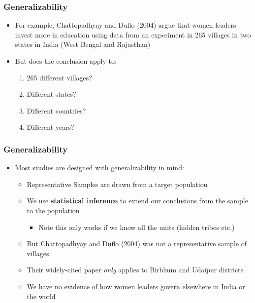 \documentclass[xcolor=x11names,compress]{beamer}\usepackage[]{graphicx}\usepackage[]{xcolor}
\renewcommand{\(}{\begin{columns}}
\renewcommand{\)}{\end{columns}}
\newcommand{\<}[1]{\begin{column}{#1}}
\renewcommand{\>}{\end{column}}
\begin{document}
\begin{frame}
\frametitle{Generalizability}
\begin{itemize}
\item For example, Chattopadhyay and Duflo (2004) argue that women leaders invest more in education using data from an experiment in 265 villages in two states in India (West Bengal and Rajasthan)
\pause
\item But does the conclusion apply to:
\pause
\begin{enumerate}
\item 265 different villages?
\pause
\item Different states?
\pause
\item Different countries?
\pause
\item Different years?
\end{enumerate}
\end{itemize}
\end{frame}

\begin{frame}
\frametitle{Generalizability}
\begin{itemize}
\item Most studies are designed with generalizability in mind:
\pause
\begin{itemize}
\item Representative Samples are drawn from a target population
\pause
\item We use \textbf{statistical inference} to extend our conclusions from the sample to the population
\pause
\begin{itemize}
\item Note this only works if we know all the units (hidden tribes etc.)
\pause
\end{itemize}
\item But Chattopadhyay and Duflo (2004) was not a representative sample of villages
\pause
\item Their widely-cited paper \textit{only} applies to Birbhum and Udaipur districts
\pause
\item We have no evidence of how women leaders govern elsewhere in India or the world
\end{itemize}
\end{itemize}
\end{frame}
\end{document}
